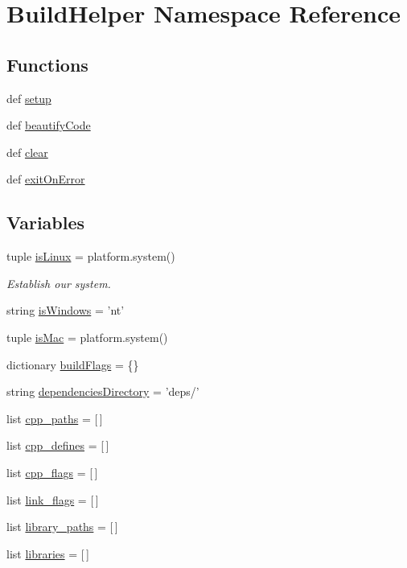 \hypertarget{namespaceBuildHelper}{\section{Build\-Helper Namespace Reference}
\label{namespaceBuildHelper}
}
\subsection*{Functions}
\begin{DoxyCompactItemize}
\item 
def \hyperlink{namespaceBuildHelper_ad532b2d715c98f35e01199577efc559a}{setup}
\item 
def \hyperlink{namespaceBuildHelper_a1043cadcecc7a026e9a56564f40a16fa}{beautify\-Code}
\item 
def \hyperlink{namespaceBuildHelper_a396c0e496c25a2cc11c27efedc2b690c}{clear}
\item 
def \hyperlink{namespaceBuildHelper_a80577df34bf898475bc42310a0b93b99}{exit\-On\-Error}
\end{DoxyCompactItemize}
\subsection*{Variables}
\begin{DoxyCompactItemize}
\item 
tuple \hyperlink{namespaceBuildHelper_a2b4ffb2416b43239c8380120262128c6}{is\-Linux} = platform.\-system()
\begin{DoxyCompactList}\small\item\em Establish our system. \end{DoxyCompactList}\item 
string \hyperlink{namespaceBuildHelper_a75da1b5396066bf9c0e36148920fafa6}{is\-Windows} = 'nt'
\item 
tuple \hyperlink{namespaceBuildHelper_a636f10d9e3cea6a72e75fd7ce7c5a9d0}{is\-Mac} = platform.\-system()
\item 
dictionary \hyperlink{namespaceBuildHelper_ae6e73da20b07d908ae39169423080658}{build\-Flags} = \{\}
\item 
string \hyperlink{namespaceBuildHelper_a6468554b04e6e16120b748e91b214ffc}{dependencies\-Directory} = 'deps/'
\item 
list \hyperlink{namespaceBuildHelper_a3ef319545a26f3d8f094acc8d1623bc3}{cpp\-\_\-paths} = \mbox{[}$\,$\mbox{]}
\item 
list \hyperlink{namespaceBuildHelper_a82ebf50fb6a2bf83f595dc90654de642}{cpp\-\_\-defines} = \mbox{[}$\,$\mbox{]}
\item 
list \hyperlink{namespaceBuildHelper_a5f67ef24924ddcacd1cb393c5f3a12e3}{cpp\-\_\-flags} = \mbox{[}$\,$\mbox{]}
\item 
list \hyperlink{namespaceBuildHelper_a655fd191e806d11d88de4f82bfd56b1e}{link\-\_\-flags} = \mbox{[}$\,$\mbox{]}
\item 
list \hyperlink{namespaceBuildHelper_aab7e6b32acfafe36dae0386194168a29}{library\-\_\-paths} = \mbox{[}$\,$\mbox{]}
\item 
list \hyperlink{namespaceBuildHelper_ab4bf9ec0398d0d80656452e9a5591d2b}{libraries} = \mbox{[}$\,$\mbox{]}
\end{DoxyCompactItemize}



